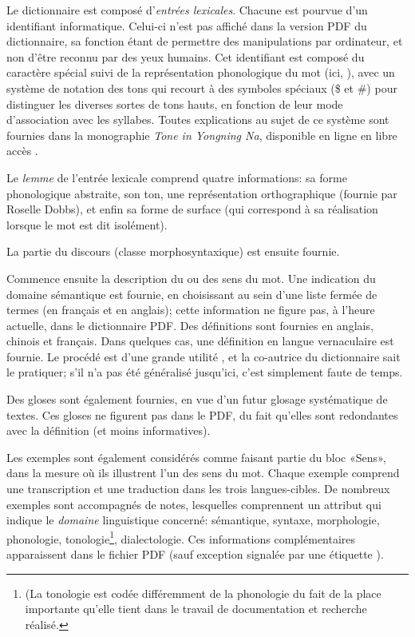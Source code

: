 Le dictionnaire est composé d'\emph{entrées lexicales}. Chacune est pourvue d'un identifiant informatique. Celui-ci n'est pas affiché dans la version PDF du dictionnaire, sa fonction étant de permettre des manipulations par ordinateur, et non d'être reconnu par des yeux humains. Cet identifiant est composé du caractère spécial  suivi de la représentation phonologique du mot (ici, ), avec un système de notation des tons qui recourt à des symboles spéciaux (\$ et \#) pour distinguer les diverses sortes de tons hauts, en fonction de leur mode d’association avec les syllabes. Toutes explications au sujet de ce système sont fournies dans la monographie \emph{Tone in Yongning Na}, disponible en ligne en libre accès \parencite[80-90]{michaud2017}.

Le \emph{lemme} de l'entrée lexicale comprend quatre informations: sa forme phonologique abstraite, son ton, une représentation orthographique (fournie par Roselle Dobbs), et enfin sa forme de surface (qui correspond à sa réalisation lorsque le mot est dit isolément).

La partie du discours (classe morphosyntaxique) est ensuite fournie.

Commence ensuite la description du ou des sens du mot. Une indication du domaine sémantique est fournie, en choisissant au sein d'une liste fermée de termes (en français et en anglais); cette information ne figure pas, à l'heure actuelle, dans le dictionnaire PDF. Des définitions sont fournies en anglais, chinois et français. Dans quelques cas, une définition en langue vernaculaire est fournie. Le procédé est d'une grande utilité \parencite{dingemanse_folk_2015}, et la co-autrice du dictionnaire sait le pratiquer; s'il n'a pas été généralisé jusqu'ici, c'est simplement faute de temps.

Des gloses sont également fournies, en vue d'un futur glosage systématique de textes. Ces gloses ne figurent pas dans le PDF, du fait qu'elles sont redondantes avec la définition (et moins informatives).

Les exemples sont également considérés comme faisant partie du bloc «Sens», dans la mesure où ils illustrent l'un des sens du mot. Chaque exemple comprend une transcription et une traduction dans les trois langues-cibles. De nombreux exemples sont accompagnés de notes, lesquelles comprennent un attribut qui indique le \emph{domaine} linguistique concerné: sémantique, syntaxe, morphologie, phonologie, tonologie\footnote{(La tonologie est codée différemment de la phonologie du fait de la place importante qu'elle tient dans le travail de documentation et recherche réalisé.}, dialectologie. Ces informations complémentaires apparaissent dans le fichier PDF (sauf exception signalée par une étiquette ).

